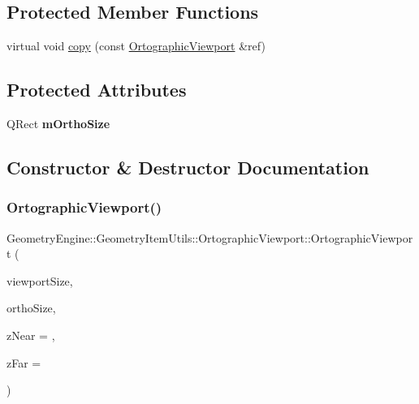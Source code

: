 \subsection*{Protected Member Functions}
\begin{DoxyCompactItemize}
\item 
virtual void \mbox{\hyperlink{class_geometry_engine_1_1_geometry_item_utils_1_1_ortographic_viewport_a01e153a7802a6593e0336464e3d8d3af}{copy}} (const \mbox{\hyperlink{class_geometry_engine_1_1_geometry_item_utils_1_1_ortographic_viewport}{Ortographic\+Viewport}} \&ref)
\end{DoxyCompactItemize}
\subsection*{Protected Attributes}
\begin{DoxyCompactItemize}
\item 
\mbox{\label{class_geometry_engine_1_1_geometry_item_utils_1_1_ortographic_viewport_adf03f40d6e79f06fb48e38eca117f46e}} 
Q\+Rect {\bfseries m\+Ortho\+Size}
\end{DoxyCompactItemize}


\subsection{Constructor \& Destructor Documentation}
\mbox{\label{class_geometry_engine_1_1_geometry_item_utils_1_1_ortographic_viewport_ab209a520eb03901cc658da622914b5f7}} 
\subsubsection{\texorpdfstring{OrtographicViewport()}{OrtographicViewport()}\hspace{0.1cm}{\footnotesize\ttfamily [1/2]}}
{\footnotesize\ttfamily Geometry\+Engine\+::\+Geometry\+Item\+Utils\+::\+Ortographic\+Viewport\+::\+Ortographic\+Viewport (\begin{DoxyParamCaption}\item[{const Q\+Vector4D \&}]{viewport\+Size,  }\item[{const Q\+Rect \&}]{ortho\+Size,  }\item[{G\+Ldouble}]{z\+Near = {},  }\item[{G\+Ldouble}]{z\+Far = {} }\end{DoxyParamCaption})}

